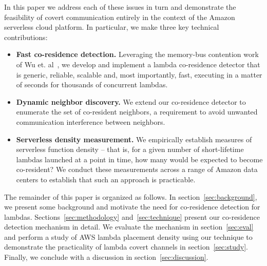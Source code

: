 In this paper we address each of these issues in turn and demonstrate
the feasibility of covert communication entirely in the context of the
Amazon serverless cloud platform.  In particular, we make three key technical
contributions:
\begin{itemize}
\item{\bf{Fast co-residence detection.}}  Leveraging the memory-bus contention
  work of Wu et. al~\cite{wuusenix2012}, we develop and implement a
  lambda co-residence detector that is generic, reliable, scalable
  and, most importantly, fast, executing in a matter of seconds for thousands of
  concurrent lambdas.
\item{\bf{Dynamic neighbor discovery.}}  We extend our co-residence
  detector to enumerate the set of co-resident neighbors, a
  requirement to avoid unwanted communication interference between
  neighbors.
\item{\bf{Serverless density measurement.}}  We empirically establish
  measures of serverless function density -- that is, for a given
  number of short-lifetime lambdas launched at a point in time, how
  many would be expected to become co-resident?  We conduct these
  measurements across a range of Amazon data centers to establish that
  such an approach is practicable.
\end{itemize}



The remainder of this paper is organized as follows. In section~\ref{sec:background}, 
we present some background and motivate the need for 
co-residence detection for lambdas. Sections~\ref{sec:methodology} and~\ref{sec:technique} 
present our co-residence detection mechanism in detail. 
We evaluate the mechanism in section~\ref{sec:eval} and 
perform a study of AWS lambda placement density using our technique 
to demonstrate the practicality of lambda covert channels in section~\ref{sec:study}.
Finally, we conclude with a discussion in section~\ref{sec:discussion}.

